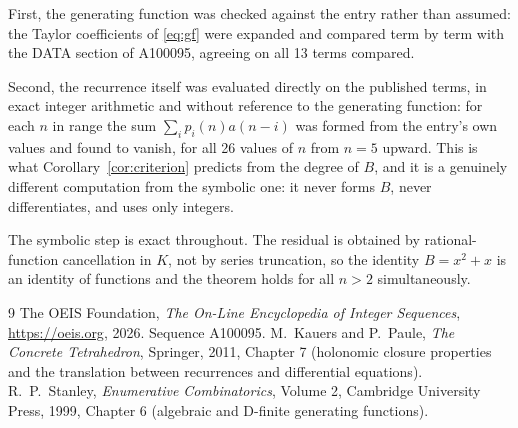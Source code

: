 \documentclass[11pt,a4paper]{article}
\theoremstyle{plain}
\theoremstyle{definition}
\begin{document}
First, the generating function was checked against the entry rather than assumed: the
Taylor coefficients of \eqref{eq:gf} were expanded and compared term by term with the DATA
section of A100095, agreeing on all 13 terms compared.

Second, the recurrence itself was evaluated directly on the published terms, in exact
integer arithmetic and without reference to the generating function: for each $n$ in range
the sum $\sum_{i}p_{i}(n)a(n-i)$ was formed from the entry's own values and found to
vanish, for all 26 values of $n$ from $n=5$ upward. This is what
Corollary~\ref{cor:criterion} predicts from the degree of $B$, and it is a genuinely
different computation from the symbolic one: it never forms $B$, never differentiates, and
uses only integers.

The symbolic step is exact throughout. The residual is obtained by rational-function
cancellation in $K$, not by series truncation, so the identity $B=x^{2} + x$ is an
identity of functions and the theorem holds for all $n>2$ simultaneously.

\begin{thebibliography}{9}
 The OEIS Foundation, \emph{The On-Line Encyclopedia of Integer Sequences},
\url{https://oeis.org}, 2026. Sequence A100095.
 M.~Kauers and P.~Paule, \emph{The Concrete Tetrahedron}, Springer, 2011,
Chapter 7 (holonomic closure properties and the translation between recurrences and
differential equations).
 R.~P.~Stanley, \emph{Enumerative Combinatorics}, Volume 2, Cambridge
University Press, 1999, Chapter 6 (algebraic and D-finite generating functions).
\end{thebibliography}
\end{document}

